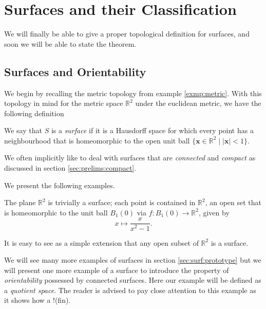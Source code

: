 

\section{Surfaces and their Classification}
\label{sec:surf}

We will finally be able to give a proper topological definition for
surfaces, and soon we will be able to state the theorem.

\subsection{Surfaces and Orientability}
\label{sec:surf:surfaces}

We begin by recalling the metric topology from example
\ref{exmp:metric}. With this topology in mind for the metric space
$\mathbb{R}^2$ under the euclidean metric, we have the following
definition

\begin{defn}
  We say that $S$ is a \emph{surface} if it is a Hausdorff space for
  which every point has a neighbourhood that is homeomorphic to the
  open unit ball $\{\mathbf{x} \in \mathbb{R}^2 \mid \lvert \mathbf{x}
  \rvert < 1 \}$.
\end{defn}

We often implicitly like to deal with surfaces that are
\emph{connected} and \emph{compact} as discussed in section
\ref{sec:prelims:compact}.

We present the following examples.

\begin{exmp}
  The plane $\mathbb{R}^2$ is trivially a surface; each point is
  contained in $\mathbb{R}^2$, an open set that is homeomorphic to the
  unit ball $B_1(0)$ via $f:B_1(0) \rightarrow \mathbb{R}^2$, given by
  \[
    x \mapsto \frac{x}{x^2 - 1}.
  \]

  It is easy to see as a simple extension that any open subset of
  $\mathbb{R}^2$ is a surface.
\end{exmp}


We will see many more examples of surfaces in section
\ref{sec:surf:prototype} but we will present one more example of a
surface to introduce the property of \emph{orientability} possessed by
connected surfaces. Here our example will be defined as a
\emph{quotient space}. The reader is advised to pay close attention to
this example as it shows how a !(fin).

